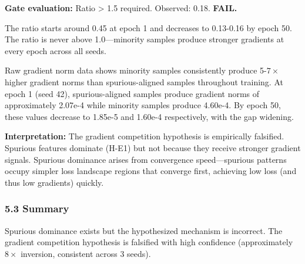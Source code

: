 \textbf{Gate evaluation:} Ratio > 1.5 required. Observed: 0.18. \textbf{FAIL.}

The ratio starts around 0.45 at epoch 1 and decreases to 0.13-0.16 by epoch 50. The ratio is never above 1.0---minority samples produce stronger gradients at every epoch across all seeds.

Raw gradient norm data shows minority samples consistently produce 5-$7\times$ higher gradient norms than spurious-aligned samples throughout training. At epoch 1 (seed 42), spurious-aligned samples produce gradient norms of approximately 2.07e-4 while minority samples produce 4.60e-4. By epoch 50, these values decrease to 1.85e-5 and 1.60e-4 respectively, with the gap widening.

\textbf{Interpretation:} The gradient competition hypothesis is empirically falsified. Spurious features dominate (H-E1) but not because they receive stronger gradient signals. Spurious dominance arises from convergence speed---spurious patterns occupy simpler loss landscape regions that converge first, achieving low loss (and thus low gradients) quickly.

\subsubsection{5.3 Summary}

\begin{table}[htbp]
\centering
{}
\end{table}

Spurious dominance exists but the hypothesized mechanism is incorrect. The gradient competition hypothesis is falsified with high confidence (approximately $8\times$ inversion, consistent across 3 seeds).
